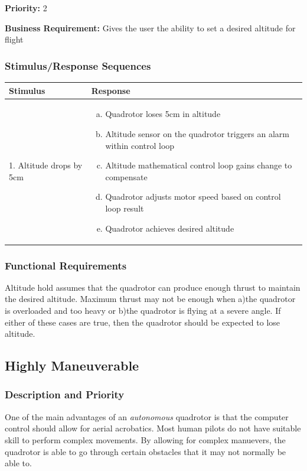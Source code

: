 \documentclass[english]{article}
\numberwithin{equation}{section} %
\begin{document}
\textbf{Priority:} 2

\textbf{Business Requirement:} Gives the user the ability to set a desired altitude for flight

\subsubsection{Stimulus/Response Sequences}

\begin{longtable}{p{3cm} | p{8.5cm}}
\hline
\textbf{Stimulus} & \textbf{Response}\\
\hline
1. Altitude drops by 5cm &
\begin{enumerate}[(a)]\itemsep1pt %
\item Quadrotor loses 5cm in altitude
\item Altitude sensor on the quadrotor triggers an alarm within control loop
\item Altitude mathematical control loop gains change to compensate
\item Quadrotor adjusts motor speed based on control loop result
\item Quadrotor achieves desired altitude
\end{enumerate}
\\ 
\hline
\end{longtable}
\subsubsection{Functional Requirements}
Altitude hold assumes that the quadrotor can produce enough thrust to maintain the desired altitude. Maximum thrust may not be enough when a)the quadrotor is overloaded and too heavy or b)the quadrotor is flying at a severe angle. If either of these cases are true, then the quadrotor should be expected to lose altitude.
\bigskip
\subsection{Highly Maneuverable}
\subsubsection{Description and Priority}
One of the main advantages of an \textit{autonomous} quadrotor is that the computer control should allow for aerial acrobatics. Most human pilots do not have suitable skill to perform complex movements. By allowing for complex manuevers, the quadrotor is able to go through certain obstacles that it may not normally be able to.
\end{document}
